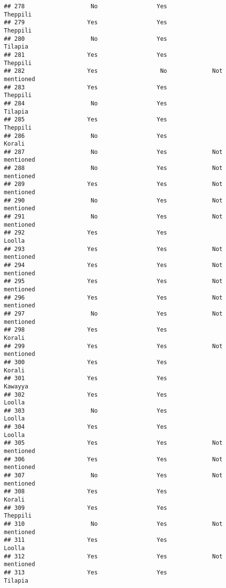 \documentclass[
]{article}
\begin{document}
\begin{verbatim}
## 278                   No                 Yes                 Theppili 
## 279                  Yes                 Yes                 Theppili 
## 280                   No                 Yes                  Tilapia 
## 281                  Yes                 Yes                 Theppili 
## 282                  Yes                  No             Not mentioned
## 283                  Yes                 Yes                 Theppili 
## 284                   No                 Yes                  Tilapia 
## 285                  Yes                 Yes                 Theppili 
## 286                   No                 Yes                   Korali 
## 287                   No                 Yes             Not mentioned
## 288                   No                 Yes             Not mentioned
## 289                  Yes                 Yes             Not mentioned
## 290                   No                 Yes             Not mentioned
## 291                   No                 Yes             Not mentioned
## 292                  Yes                 Yes                   Loolla 
## 293                  Yes                 Yes             Not mentioned
## 294                  Yes                 Yes             Not mentioned
## 295                  Yes                 Yes             Not mentioned
## 296                  Yes                 Yes             Not mentioned
## 297                   No                 Yes             Not mentioned
## 298                  Yes                 Yes                   Korali 
## 299                  Yes                 Yes             Not mentioned
## 300                  Yes                 Yes                   Korali 
## 301                  Yes                 Yes                  Kawayya 
## 302                  Yes                 Yes                   Loolla 
## 303                   No                 Yes                   Loolla 
## 304                  Yes                 Yes                   Loolla 
## 305                  Yes                 Yes             Not mentioned
## 306                  Yes                 Yes             Not mentioned
## 307                   No                 Yes             Not mentioned
## 308                  Yes                 Yes                   Korali 
## 309                  Yes                 Yes                 Theppili 
## 310                   No                 Yes             Not mentioned
## 311                  Yes                 Yes                   Loolla 
## 312                  Yes                 Yes             Not mentioned
## 313                  Yes                 Yes                  Tilapia 

\end{verbatim}
\end{document}
